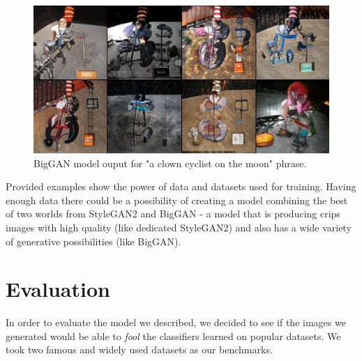 \documentclass[12pt,a4paper,openany]{book}
\begin{document}
\begin{figure}[H]
    \centering
    \includegraphics[scale=0.55]{figs/clown_biggan.PNG}
    \caption{BigGAN model ouput for "a clown cyclist on the moon" phrase.}\label{Fig:clownbiggan}
\end{figure}

\noindent Provided examples show the power of data and datasets used for training. Having enough data there could be a possibility of creating a model combining the best of two worlds from StyleGAN2 and BigGAN - a model that is producing crips images with high quality (like dedicated StyleGAN2) and also has a wide variety of generative possibilities (like BigGAN).

\newpage

\chapter{Evaluation}


\noindent In order to evaluate the model we described, we decided to see if the images we generated would be able to \textit{fool} the classifiers learned on popular datasets.
We took two famous and widely used datasets as our benchmarks.
\end{document}
